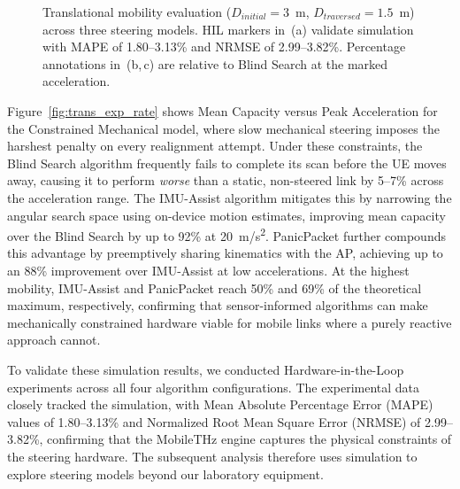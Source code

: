 \documentclass[fleqn,10pt]{wlscirep}
\newcommand{\legmark}[2]{%
    \tikz[Blind Search=-0.5ex]{
        \node[#2, fill=#1, draw=#1, inner sep=2pt, scale=0.8] at (0,0) {};
    }%
}
\begin{document}
\begin{figure}[ht!]
    
    \caption{Translational mobility evaluation ($D_{initial} = 3$~m, $D_{traversed} = 1.5$~m) across three steering models. HIL markers in~(a) validate simulation with MAPE of 1.80--3.13\% and NRMSE of 2.99--3.82\%. Percentage annotations in~(b,\,c) are relative to Blind Search at the marked acceleration.}
    \label{fig:translational_rate}
    \vspace{-5pt}
\end{figure}


Figure~\ref{fig:trans_exp_rate} shows Mean Capacity versus Peak Acceleration for the Constrained Mechanical model, where slow mechanical steering imposes the harshest penalty on every realignment attempt. Under these constraints, the Blind Search algorithm frequently fails to complete its scan before the UE moves away, causing it to perform \textit{worse} than a static, non-steered link by 5--7\% across the acceleration range. The IMU-Assist algorithm mitigates this by narrowing the angular search space using on-device motion estimates, improving mean capacity over the Blind Search by up to 92\% at \SI{20}{m/s^2}. PanicPacket further compounds this advantage by preemptively sharing kinematics with the AP, achieving up to an 88\% improvement over IMU-Assist at low accelerations. At the highest mobility, IMU-Assist and PanicPacket reach 50\% and 69\% of the theoretical maximum, respectively, confirming that sensor-informed algorithms can make mechanically constrained hardware viable for mobile links where a purely reactive approach cannot.

To validate these simulation results, we conducted Hardware-in-the-Loop experiments across all four algorithm configurations. The experimental data closely tracked the simulation, with Mean Absolute Percentage Error (MAPE) values of 1.80--3.13\% and Normalized Root Mean Square Error (NRMSE) of 2.99--3.82\%, confirming that the MobileTHz engine captures the physical constraints of the steering hardware. The subsequent analysis therefore uses simulation to explore steering models beyond our laboratory equipment.
\end{document}
